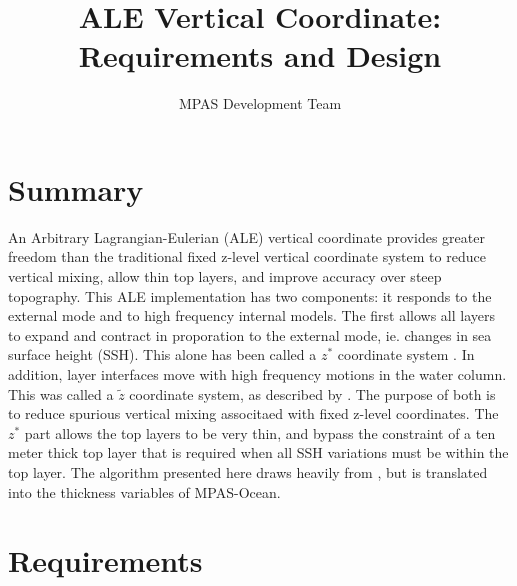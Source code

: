 \documentclass[11pt]{report}
\begin{document}
\title{ALE Vertical Coordinate: \\
Requirements and Design}
\author{MPAS Development Team}


 
\maketitle
\tableofcontents


\chapter{Summary}

An Arbitrary Lagrangian-Eulerian (ALE) vertical coordinate provides greater freedom than the traditional fixed z-level vertical coordinate system to reduce vertical mixing, allow thin top layers, and improve accuracy over steep topography.  This ALE implementation has two components: it responds to the external mode and to high frequency internal models.  The first allows all layers to expand and contract in proporation to the external mode, ie. changes in sea surface height (SSH).  This alone has been called a $z^*$ coordinate system \cite{Adcroft:2004tv,Campin:2004wj}.  In addition, layer interfaces move with high frequency motions in the water column.  This was called a ${\tilde z}$ coordinate system, as described by \cite{Leclair:2011ud}.  The purpose of both is to reduce spurious vertical mixing associtaed with fixed z-level coordinates.  The $z^*$ part allows the top layers to be very thin, and bypass the constraint of a ten meter thick top layer that is required when all SSH variations must be within the top layer.  The algorithm presented here draws heavily from \cite{Leclair:2011ud}, but is translated into the thickness variables of MPAS-Ocean.



\chapter{Requirements}
\end{document}

